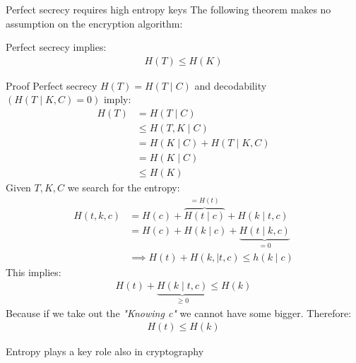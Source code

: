 \begin{parag}{Perfect secrecy requires high entropy keys}
    The following theorem makes no assumption on the encryption algorithm:
    \begin{center}
        
        
    \end{center}
    
    \begin{theoreme}
        Perfect secrecy implies:
        \begin{align*}
            H(T) \leq H(K)
        \end{align*}
        
    \end{theoreme}
   \begin{subparag}{Proof}
       Perfect secrecy $H(T) = H(T \mid  C)$ and decodability $(H(T \mid  K, C) = 0)$ imply:
       \begin{align*}
           H(T) &= H(T \mid  C)\\
                &\leq H(T, K \mid C)\\
                &= H(K \mid  C) + H(T \mid  K, C)\\
                 &= H(K \mid  C)\\
                &\leq H(K)
       \end{align*}
       Given  $T, K, C$ we search for the entropy:
       \begin{align*}
           H(t, k, c) &= H(c) + \overbrace{H(t \mid  c)}^{=H(t)} + H(k \mid  t, c) \\
                      &= H(c) + H(k \mid  c) + \underbrace{H(t \mid  k, c)}_{= 0} \\
                      &\implies H(t) + H(k, \mid  t, c) \leq h(k \mid  c)
       \end{align*}
This implies:
\begin{align*}
    H(t) + \underbrace{H(k \mid t, c)}_{ \geq 0} \leq H(k)
\end{align*}
Because if we take out the \textit{"Knowing c"} we cannot have some bigger. 
Therefore:
\begin{align*}
    H(t) \leq H(k)
\end{align*}



   \end{subparag}
   \begin{framedremark}
       Entropy plays a key role also in cryptography
   \end{framedremark}
   
\end{parag}

